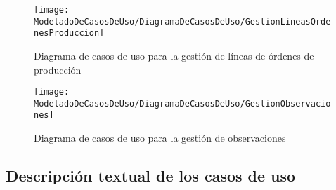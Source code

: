     \begin{figure}[H]
		\centering
		\texttt{[image: ModeladoDeCasosDeUso/DiagramaDeCasosDeUso/GestionLineasOrdenesProduccion]}
		\caption{Diagrama de casos de uso para la gestión de líneas de órdenes de producción}
	\label{fig:GestionLineasOrdenesProduccion}
    \end{figure}
    \begin{figure}[H]
		\centering
		\texttt{[image: ModeladoDeCasosDeUso/DiagramaDeCasosDeUso/GestionObservaciones]}
		\caption{Diagrama de casos de uso para la gestión de observaciones}
	\label{fig:GestionObservaciones}
	\end{figure}
	\clearpage %
	\subsection{Descripción textual de los casos de uso}
